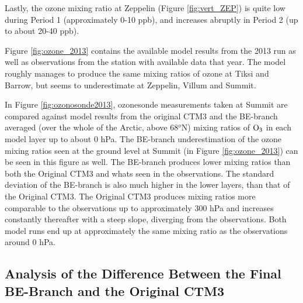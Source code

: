 Lastly, the ozone mixing ratio at Zeppelin (Figure \ref{fig:vert_ZEP}) is quite low during Period 1 (approximately 0-10 ppb), and increases abruptly in Period 2 (up to about 20-40 ppb). 







\medskip

Figure \ref{fig:ozone_2013} contains the available model results from the 2013 run as well as observations from the station with available data that year. The model roughly manages to produce the same mixing ratios of ozone at Tiksi and Barrow, but seems to underestimate at Zeppelin, Villum and Summit. 



\medskip

In Figure \ref{fig:ozonosonde2013}, ozonesonde measurements taken at Summit are compared against model results from the original CTM3 and the BE-branch averaged (over the whole of the Arctic, above 68$^o$N) mixing ratios of $\mathrm{O_3}$ in each model layer up to about 0 hPa. The BE-branch underestimation of the ozone mixing ratios seen at the ground level at Summit (in Figure \ref{fig:ozone_2013}) can be seen in this figure as well. The BE-branch produces lower mixing ratios than both the Original CTM3 and whats seen in the observations. The standard deviation of the BE-branch is also much higher in the lower layers, than that of the Original CTM3. The Original CTM3 produces mixing ratios more comparable to the observations up to approximately 300 hPa and increases constantly thereafter with a steep slope, diverging from the observations. Both model runs end up at approximately the same mixing ratio as the observations around 0 hPa.  


\clearpage



\subsection{Analysis of the Difference Between the Final BE-Branch and the Original CTM3}\label{sec:res_origBE} 

